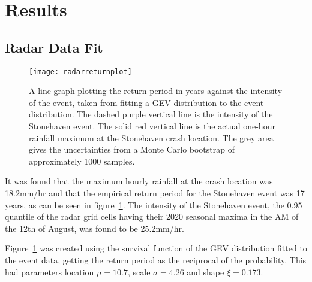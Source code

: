 \section{Results}\label{sec:results}

\begin{comment}
This section should detail the obtained results in a clear,
easy-to-follow manner. It is important to make clear what are original
results and what are repeats of previous calculations or computations.
Remember that long tables of numbers are just as boring to read as
they are to type-in!

Use graphs to present your results wherever practicable.

Results or computations should be presented with uncertainties
(errors), both statistical and systematic where applicable.

Be selective in what you include: half a dozen \emph{e.g.}~tables that
contain wrong data you collected while you forgot to switch on the
computer are not relevant and may mask the correct results.
\end{comment}

\subsection{Radar Data Fit}\label{subsec:radardatafit}

\begin{figure}[H]
    \centering
    \texttt{[image: radarreturnplot]}
    \caption{A line graph plotting the return period in years against the intensity of the event,
        taken from fitting a GEV distribution to the event distribution.
    The dashed purple vertical line is the intensity of the Stonehaven event.
    The solid red vertical line is the actual one-hour rainfall maximum at the Stonehaven crash location.
    The grey area gives the uncertainties from a Monte Carlo bootstrap of approximately 1000 samples.}
    \label{fig:radarreturnplot}
\end{figure}

It was found that the maximum hourly rainfall at the crash location was 18.2mm/hr and
    that the empirical return period for the Stonehaven event was 17 years,
    as can be seen in figure~\ref{fig:radarreturnplot}.
The intensity of the Stonehaven event,
    the 0.95 quantile of the radar grid cells having their 2020 seasonal maxima in the AM of the 12th of August,
    was found to be 25.2mm/hr.

Figure~\ref{fig:radarreturnplot} was created using the survival function of the GEV distribution fitted to the event data,
    getting the return period as the reciprocal of the probability.
This had parameters location $\mu = 10.7$, scale $\sigma = 4.26$ and shape $\xi = 0.173$.

